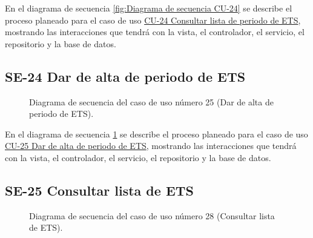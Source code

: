 En el diagrama de secuencia \ref{fig:Diagrama de secuencia CU-24} se describe el proceso planeado para el caso de uso \hyperlink{CU-24}{CU-24 Consultar lista de periodo de ETS}, mostrando las interacciones que tendrá con la vista, el controlador, el servicio, el repositorio y la base de datos.

\newpage

\subsection{SE-24 Dar de alta de periodo de ETS}

\begin{figure}[htbp!]
	\begin{center}
		\caption{Diagrama de secuencia del caso de uso número 25 (Dar de alta de periodo de ETS).}
		\label{fig:Diagrama de secuencia CU-25}
	\end{center}
\end{figure}

En el diagrama de secuencia \ref{fig:Diagrama de secuencia CU-25} se describe el proceso planeado para el caso de uso \hyperlink{CU-25}{CU-25 Dar de alta de periodo de ETS}, mostrando las interacciones que tendrá con la vista, el controlador, el servicio, el repositorio y la base de datos.

\newpage

\subsection{SE-25 Consultar lista de ETS}

\begin{figure}[htbp!]
	\begin{center}
		\caption{Diagrama de secuencia del caso de uso número 28 (Consultar lista de ETS).}
		\label{fig:Diagrama de secuencia CU-28}
	\end{center}
\end{figure}

